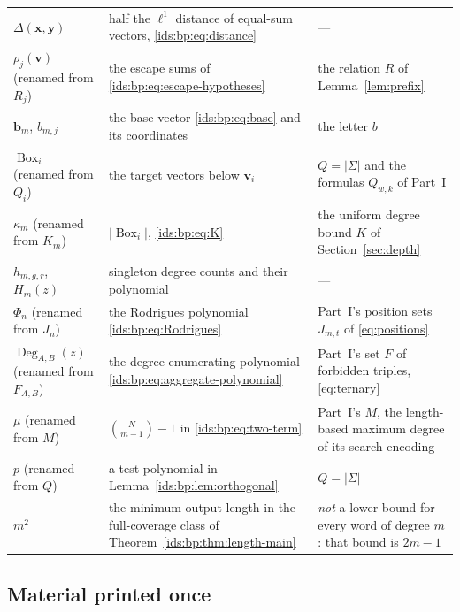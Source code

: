 \documentclass[11pt,letterpaper]{article}
\theoremstyle{definition}\newtheorem{definition}[theorem]{Definition}
\theoremstyle{remark}\newtheorem{remark}[theorem]{Remark}
\theoremstyle{definition}\newtheorem{question}[theorem]{Question}
\begin{document}
\begin{table}[htbp]
\begin{tabular}{>{\raggedright}p{.19\linewidth}>{\raggedright}p{.39\linewidth}>{\raggedright\arraybackslash}p{.34\linewidth}}
$\Delta(\mathbf x,\mathbf y)$ & half the $\ell^1$ distance of equal-sum
 vectors, \eqref{ids:bp:eq:distance} & ---\\
$\rho_j(\mathbf v)$ (renamed from $R_j$) & the escape sums of
 \eqref{ids:bp:eq:escape-hypotheses} & the relation $R$ of
 Lemma~\ref{lem:prefix}\\
$\mathbf b_m$, $b_{m,j}$ & the base vector \eqref{ids:bp:eq:base} and its
 coordinates & the letter $b$\\
$\operatorname{Box}_i$ (renamed from $Q_i$) & the target vectors below
 $\mathbf v_i$ & $Q=|\Sigma|$ and the formulas $Q_{w,k}$ of Part~I\\
$\kappa_m$ (renamed from $K_m$) & $|\operatorname{Box}_i|$,
 \eqref{ids:bp:eq:K} & the uniform degree bound $K$ of
 Section~\ref{sec:depth}\\
$h_{m,g,r}$, $H_m(z)$ & singleton degree counts and their polynomial & ---\\
$\Phi_n$ (renamed from $J_n$) & the Rodrigues polynomial
 \eqref{ids:bp:eq:Rodrigues} & Part~I's position sets $J_{m,t}$ of
 \eqref{eq:positions}\\
$\operatorname{Deg}_{A,B}(z)$ (renamed from $F_{A,B}$) & the
 degree-enumerating polynomial \eqref{ids:bp:eq:aggregate-polynomial} &
 Part~I's set $F$ of forbidden triples, \eqref{eq:ternary}\\
$\mu$ (renamed from $M$) & $\binom{N}{m-1}-1$ in
 \eqref{ids:bp:eq:two-term} & Part~I's $M$, the length-based maximum degree
 of its search encoding\\
$p$ (renamed from $Q$) & a test polynomial in
 Lemma~\ref{ids:bp:lem:orthogonal} & $Q=|\Sigma|$\\
$m^2$ & the minimum output length in the full-coverage class of
 Theorem~\ref{ids:bp:thm:length-main} & \emph{not} a lower bound for every
 word of degree $m$: that bound is $2m-1$\\
\bottomrule
\end{tabular}
\end{table}

\subsection{Material printed once}\label{ids:bp:sec:imported}
\end{document}
